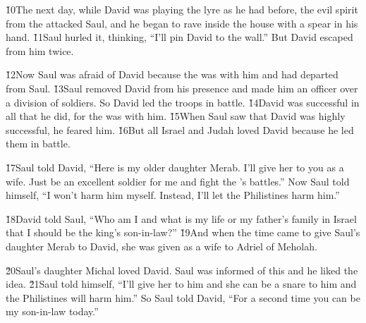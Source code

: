 \v{10}The next day, while David was playing the lyre as he had before, the evil spirit from the  attacked Saul, and he began to rave inside the house with a spear in his hand. \v{11}Saul hurled it, thinking, ``I'll pin David to the wall.'' But David escaped from him twice.

\v{12}Now Saul was afraid of David because the  was with him and had departed from Saul. \v{13}Saul removed David from his presence and made him an officer over a division of soldiers. So David led the troops in battle. \v{14}David was successful in all that he did, for the  was with him. \v{15}When Saul saw that David was highly successful, he feared him. \v{16}But all Israel and Judah loved David because he led them in battle.

\v{17}Saul told David, ``Here is my older daughter Merab. I'll give her to you as a wife. Just be an excellent soldier for me and fight the 's battles.'' Now Saul told himself, ``I won't harm him myself. Instead, I'll let the Philistines harm him.''

\v{18}David told Saul, ``Who am I and what is my life or my father's family in Israel that I should be the king's son-in-law?'' \v{19}And when the time came to give Saul's daughter Merab to David, she was given as a wife to Adriel of Meholah.

\v{20}Saul's daughter Michal loved David. Saul was informed of this and he liked the idea. \v{21}Saul told himself, ``I'll give her to him and she can be a snare to him and the Philistines will harm him.'' So Saul told David, ``For a second time you can be my son-in-law today.''

